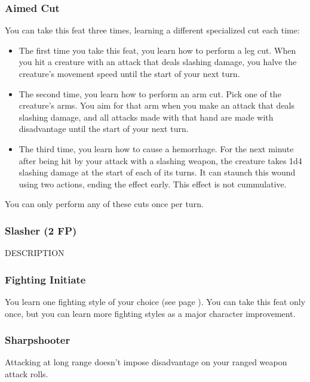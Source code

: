 \subsubsection{Aimed Cut} \label{feat::aimedcut}
    You can take this feat three times, learning a different specialized cut each time:
    \begin{itemize}
        \item The first time you take this feat, you learn how to perform a leg cut.
        When you hit a creature with an attack that deals slashing damage, you halve the creature's movement speed until the start of your next turn.
        \item The second time, you learn how to perform an arm cut.
        Pick one of the creature's arms.
        You aim for that arm when you make an attack that deals slashing damage, and all attacks made with that hand are made with disadvantage until the start of your next turn.
        \item The third time, you learn how to cause a hemorrhage.
        For the next minute after being hit by your attack with a slashing weapon, the creature takes 1d4 slashing damage at the start of each of its turns.
        It can staunch this wound using two actions, ending the effect early.
        This effect is not cummulative.
    \end{itemize}

    You can only perform any of these cuts once per turn.
\subsubsection{Slasher (2 FP)} \label{feat::slasher}
    DESCRIPTION

\subsubsection{Fighting Initiate} \label{feat::fightinginitiate}
    You learn one fighting style of your choice (see page \pageref{ssec::fightingstyles}).
    You can take this feat only once, but you can learn more fighting styles as a major character improvement.
\subsubsection{Sharpshooter} \label{feat::sharpshooter}
    Attacking at long range doesn't impose disadvantage on your ranged weapon attack rolls.

